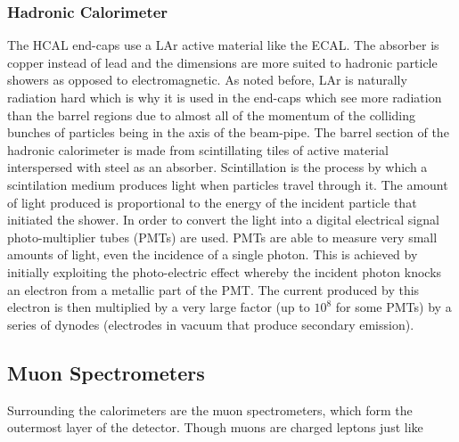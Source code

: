 \subsubsection{Hadronic Calorimeter} The HCAL end-caps use a LAr active material
like the ECAL. The absorber is copper instead of lead and the dimensions are
more suited to hadronic particle showers as opposed to electromagnetic. As noted
before, LAr is naturally radiation hard which is why it is used in the end-caps
which see more radiation than the barrel regions due to almost all of the
momentum of the colliding bunches of particles being in the axis of the
beam-pipe. The barrel section of the hadronic calorimeter is made from
scintillating tiles of active material interspersed with steel as an absorber.
Scintillation is the process by which a scintilation medium produces light when
particles travel through it. The amount of light produced is proportional to the
energy of the incident particle that initiated the shower. In order to convert
the light into a digital electrical signal photo-multiplier tubes (PMTs) are
used. PMTs are able to measure very small amounts of light, even the incidence
of a single photon. This is achieved by initially exploiting the photo-electric
effect whereby the incident photon knocks an electron from a metallic part of
the PMT. The current produced by this electron is then multiplied by a very
large factor (up to $10^8$ for some PMTs) by a series of dynodes (electrodes in
vacuum that produce secondary emission).

\subsection{Muon Spectrometers}%
\label{sec:muon}

Surrounding the calorimeters are the muon spectrometers, which form the
outermost layer of the detector. Though muons are charged leptons just like

